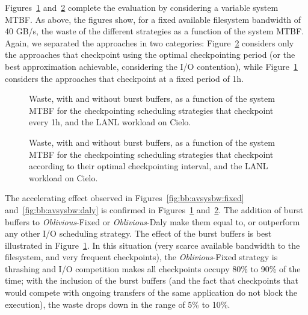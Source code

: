\documentclass[two]{article}
\newcommand{\nocoop}{\emph{Oblivious}\xspace}
\def\propfixed{\nocoop-Fixed\xspace}
\def\propdaly{\nocoop-Daly\xspace}
\begin{document}
Figures~\ref{fig:bb:mtbf:fixed} and~\ref{fig:bb:mtbf:daly} complete
the evaluation by considering a variable system MTBF. As above,
the figures show, for a fixed available filesystem bandwidth of 40
GB/s, the waste of the different strategies as a function of the
system MTBF. Again, we separated the approaches in two categories:
Figure~\ref{fig:bb:mtbf:daly} considers only the approaches that
checkpoint using the optimal checkpointing period (or the best
approximation achievable, considering the I/O contention), while
Figure~\ref{fig:bb:mtbf:fixed} considers the approaches that
checkpoint at a fixed period of 1h.

\begin{figure}
  \begin{center}
    \resizebox{1.05\linewidth}{!}{}
  \end{center}
  \caption{Waste, with and without burst buffers, as a function of the system MTBF for the
    checkpointing scheduling strategies 
    that checkpoint every 1h, and the LANL workload on
    Cielo.\label{fig:bb:mtbf:fixed}}
\end{figure}

\begin{figure}
  \begin{center}
    \resizebox{1.05\linewidth}{!}{}
  \end{center}
  \caption{Waste, with and without burst buffers, as a function of the system MTBF for the
    checkpointing scheduling strategies 
    that checkpoint according to their optimal checkpointing interval,
    and the LANL workload on Cielo. \label{fig:bb:mtbf:daly}}
\end{figure}

The accelerating effect observed in Figures~\ref{fig:bb:avsysbw:fixed}
and~\ref{fig:bb:avsysbw:daly} is confirmed in
Figures~\ref{fig:bb:mtbf:fixed} and~\ref{fig:bb:mtbf:daly}. The
addition of burst buffers to \propfixed or \propdaly make them equal
to, or outperform any other I/O scheduling strategy. The effect of the
burst buffers is best illustrated in
Figure~\ref{fig:bb:mtbf:fixed}. In this situation (very scarce
available bandwidth to the filesystem, and very frequent checkpoints),
the \propfixed strategy is thrashing and I/O competition makes all
checkpoints occupy 80\% to 90\% of the time; with the inclusion of
the burst buffers (and the fact that checkpoints that would compete
with ongoing transfers of the same application do not block the
execution), the waste drops down in the range of 5\% to 10\%.
\end{document}
